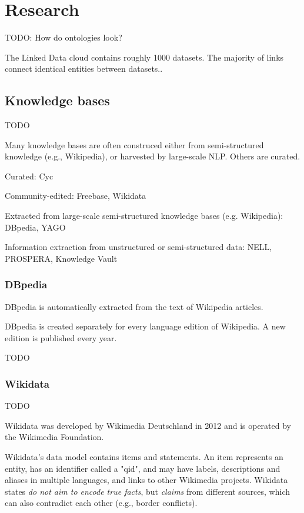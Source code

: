\chapter{Research}

TODO: How do ontologies look?

The Linked Data cloud contains roughly 1000 datasets. The majority of links
connect identical entities between datasets.\cite{kg-refinement-survey}.

\section{Knowledge bases}

TODO

Many knowledge bases are often construced either from semi-structured knowledge
(e.g., Wikipedia), or harvested by large-scale NLP. Others are curated.

Curated: Cyc

Community-edited: Freebase, Wikidata

Extracted from large-scale semi-structured knowledge bases (e.g. Wikipedia):
DBpedia, YAGO

Information extraction from unstructured or semi-structured data: NELL,
PROSPERA, Knowledge Vault

\subsection{DBpedia}

DBpedia is automatically extracted from the text of Wikipedia articles.

DBpedia is created separately for every language edition of Wikipedia.
A new edition is published every year.

TODO

\subsection{Wikidata}

TODO

Wikidata was developed by Wikimedia Deutschland in 2012 and is operated by the
Wikimedia Foundation.

Wikidata's data model contains items and statements. An item represents an
entity, has an identifier called a "qid", and may have labels, descriptions and
aliases in multiple languages, and links to other Wikimedia projects. Wikidata
states \textit{do not aim to encode true facts}, but \textit{claims} from
different sources, which can also contradict each other (e.g., border
conflicts).

